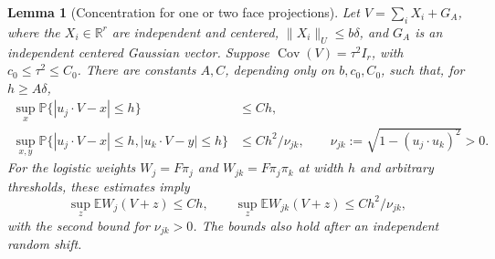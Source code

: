 \documentclass[11pt,letterpaper,twoside,leqno]{article}
\theoremstyle{bookplain}
\newtheorem{lemma}{Lemma}
\theoremstyle{bookremark}
\newcommand{\E}{\mathbb E}
\newcommand{\Pp}{\mathbb P}
\newcommand{\R}{\mathbb R}
\newcommand{\Cov}{\operatorname{Cov}}
\begin{document}
\begin{lemma}[Concentration for one or two face projections]
\label{lem:cap-concentration}
Let $V=\sum_iX_i+G_A$, where the $X_i\in\R^r$ are independent
and centered, $\|X_i\|_U\le b\delta$, and $G_A$ is an
independent centered Gaussian vector. Suppose
$\Cov(V)=\tau^2I_r$, with $c_0\le\tau^2\le C_0$.
There are constants $A,C$, depending only on $b,c_0,C_0$,
such that, for $h\ge A\delta$,
\begin{align}
 \sup_x\Pp\{|u_j\cdot V-x|\le h\}&\le Ch,
 \label{cap:one-concentration}\\
 \sup_{x,y}\Pp\{|u_j\cdot V-x|\le h,
                 |u_k\cdot V-y|\le h\}
 &\le Ch^2/\nu_{jk},\qquad
 \nu_{jk}:=\sqrt{1-(u_j\cdot u_k)^2}>0.
 \label{cap:two-concentration}
\end{align}
For the logistic weights $W_j=F\pi_j$ and $W_{jk}=F\pi_j\pi_k$
at width $h$ and arbitrary thresholds, these estimates imply
\begin{equation}
 \sup_z\E W_j(V+z)\le Ch,\qquad
 \sup_z\E W_{jk}(V+z)\le Ch^2/\nu_{jk},
 \label{cap:weight-concentration}
\end{equation}
with the second bound for $\nu_{jk}>0$.
The bounds also hold after an independent random shift.
\end{lemma}
\end{document}
